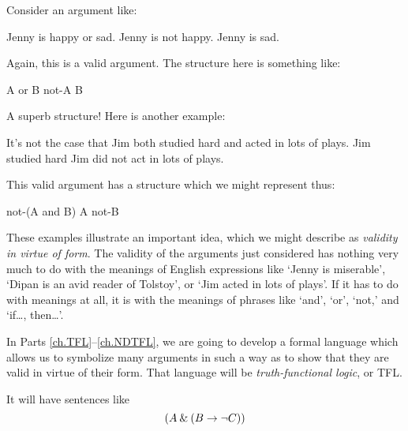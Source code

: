  Consider an argument like:
	\begin{earg}
		\prem Jenny is  happy or sad.
		\prem Jenny is not happy.
		\conc Jenny is sad.
	\end{earg}
Again, this is a valid argument. The structure here is something like:
	\begin{earg}
		\prem A or B
		\prem not-A
		\conc B
	\end{earg}
A superb structure! Here is another example:
	\begin{earg}
		\prem It's not the case that Jim both studied hard and acted in lots of plays.
		\prem Jim studied hard
		\conc Jim did not act in lots of plays.
	\end{earg}
This valid argument has a structure which we might represent thus:
	\begin{earg}
		\prem not-(A and B)
		\prem A
		\conc not-B
	\end{earg}
These examples illustrate an important idea, which we might describe as \emph{validity in virtue of form}. The validity of the arguments just considered has nothing very much to do with the meanings of English expressions like `Jenny is miserable', `Dipan is an avid reader of Tolstoy', or `Jim acted in lots of plays'. If it has to do with meanings at all, it is with the meanings of phrases like `and', `or', `not,' and `if\ldots, then\ldots'. 

In Parts \ref{ch.TFL}--\ref{ch.NDTFL}, we are going to develop a formal language which allows us to symbolize many arguments in such a way as to show that they are valid in virtue of their form. That language will be \emph{truth-functional logic}, or TFL.

It will have sentences like $$(A\mathbin{\&} (B\rightarrow\neg C))$$






